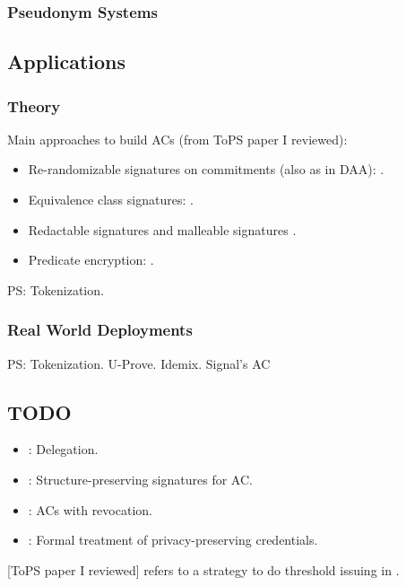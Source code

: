 \subsubsection{Pseudonym Systems}
\label{sssec:pseudonyms}


\subsection{Applications}
\label{ssec:acapplication}

\subsubsection{Theory}
\label{sssec:actheoryapp}

Main approaches to build ACs (from ToPS paper I reviewed):

\begin{itemize}
\item Re-randomizable signatures on commitments (also as in DAA):
  \cite{cl02,cl04,lmpy16,ps16}.
\item Equivalence class signatures: \cite{fhs19,hs14}.
\item Redactable signatures \cite{cdhk15,sand20} and malleable signatures
  \cite{ckl14}.
\item Predicate encryption: \cite{dmm+18}.
\end{itemize}

PS: Tokenization.

\subsubsection{Real World Deployments}
\label{sssec:acrwdeploy}

PS: Tokenization.
U-Prove.
Idemix.
Signal's AC \needcite

\subsection{TODO}

\begin{itemize}
\item \cite{bcc+09}: Delegation.
\item \cite{fhs19}: Structure-preserving signatures for AC.
\item \cite{aks12}: ACs with revocation.
\item \cite{ckl+15}: Formal treatment of privacy-preserving credentials.
\end{itemize}

[ToPS paper I reviewed] refers to a strategy to do threshold issuing in \cite{bbh06}.


